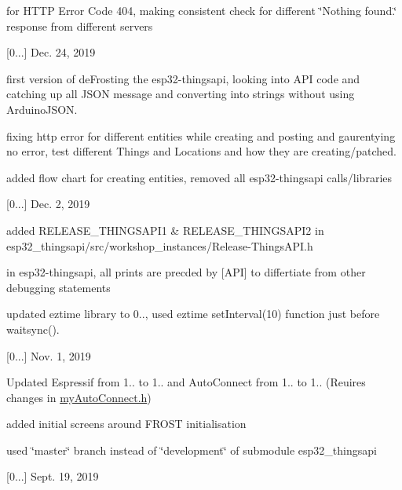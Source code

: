\begin{DoxyItemize}
\begin{DoxyItemize}
\item for H\+T\+TP Error Code 404, making consistent check for different \char`\"{}\+Nothing found.\char`\"{} response from different servers
\end{DoxyItemize}
\item \mbox{[}0...\mbox{]} Dec. 24, 2019
\begin{DoxyItemize}
\item first version of de\+Frosting the esp32-\/thingsapi, looking into A\+PI code and catching up all J\+S\+ON message and converting into strings without using Arduino\+J\+S\+ON.
\item fixing http error for different entities while creating and posting and gaurentying no error, test different Things and Locations and how they are creating/patched.
\item added flow chart for creating entities, removed all esp32-\/thingsapi calls/libraries
\end{DoxyItemize}
\item \mbox{[}0...\mbox{]} Dec. 2, 2019
\begin{DoxyItemize}
\item added R\+E\+L\+E\+A\+S\+E\+\_\+\+T\+H\+I\+N\+G\+S\+A\+P\+I1 \& R\+E\+L\+E\+A\+S\+E\+\_\+\+T\+H\+I\+N\+G\+S\+A\+P\+I2 in esp32\+\_\+thingsapi/src/workshop\+\_\+instances/\+Release-\/\+Things\+A\+P\+I.\+h
\item in esp32-\/thingsapi, all prints are precded by \mbox{[}A\+PI\mbox{]} to differtiate from other debugging statements
\item updated eztime library to 0.., used eztime set\+Interval(10) function just before waitsync().
\end{DoxyItemize}
\item \mbox{[}0...\mbox{]} Nov. 1, 2019
\begin{DoxyItemize}
\item Updated Espressif from 1.. to 1.. and Auto\+Connect from 1.. to 1.. (Reuires changes in \mbox{\hyperlink{my_auto_connect_8h}{my\+Auto\+Connect.\+h}})
\item added initial screens around F\+R\+O\+ST initialisation
\item used \char`\"{}master\char`\"{} branch instead of \char`\"{}development\char`\"{} of submodule esp32\+\_\+thingsapi
\end{DoxyItemize}
\item \mbox{[}0...\mbox{]} Sept. 19, 2019
\begin{DoxyItemize}

\end{DoxyItemize}
\end{DoxyItemize}
